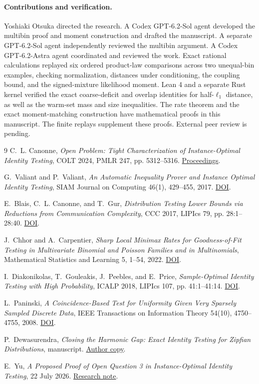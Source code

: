 \documentclass[11pt]{article}
\begin{document}
\paragraph{Contributions and verification.}
Yoshiaki Otsuka directed the research. A Codex GPT-6.2-Sol agent developed the multibin proof and moment construction and drafted the manuscript. A separate GPT-6.2-Sol agent independently reviewed the multibin argument. A Codex GPT-6.2-Astra agent coordinated and reviewed the work. Exact rational calculations replayed six ordered product-law comparisons across two unequal-bin examples, checking normalization, distances under conditioning, the coupling bound, and the signed-mixture likelihood moment. Lean 4 and a separate Rust kernel verified the exact coarse-deficit and overlap identities for half-$\ell_1$ distance, as well as the warm-set mass and size inequalities. The rate theorem and the exact moment-matching construction have mathematical proofs in this manuscript. The finite replays supplement these proofs. External peer review is pending.

\begin{thebibliography}{9}
\small
{}
C.~L. Canonne,
\emph{Open Problem: Tight Characterization of Instance-Optimal Identity Testing},
COLT 2024, PMLR 247, pp. 5312--5316.
\href{https://proceedings.mlr.press/v247/canonne24a.html}{Proceedings}.

G.~Valiant and P.~Valiant,
\emph{An Automatic Inequality Prover and Instance Optimal Identity Testing},
SIAM Journal on Computing 46(1), 429--455, 2017.
\href{https://doi.org/10.1137/151002526}{DOI}.

E.~Blais, C.~L. Canonne, and T.~Gur,
\emph{Distribution Testing Lower Bounds via Reductions from Communication Complexity},
CCC 2017, LIPIcs 79, pp. 28:1--28:40.
\href{https://doi.org/10.4230/LIPIcs.CCC.2017.28}{DOI}.

J.~Chhor and A.~Carpentier,
\emph{Sharp Local Minimax Rates for Goodness-of-Fit Testing in Multivariate Binomial and Poisson Families and in Multinomials},
Mathematical Statistics and Learning 5, 1--54, 2022.
\href{https://doi.org/10.4171/MSL/32}{DOI}.

I.~Diakonikolas, T.~Gouleakis, J.~Peebles, and E.~Price,
\emph{Sample-Optimal Identity Testing with High Probability},
ICALP 2018, LIPIcs 107, pp. 41:1--41:14.
\href{https://doi.org/10.4230/LIPIcs.ICALP.2018.41}{DOI}.

L.~Paninski,
\emph{A Coincidence-Based Test for Uniformity Given Very Sparsely Sampled Discrete Data},
IEEE Transactions on Information Theory 54(10), 4750--4755, 2008.
\href{https://doi.org/10.1109/TIT.2008.928987}{DOI}.

P.~Dewasurendra,
\emph{Closing the Harmonic Gap: Exact Identity Testing for Zipfian Distributions},
manuscript.
\href{https://andotheror.github.io/pdf/closing-the-harmonic-gap-exact-identity-testing-for-zipfian-distributi.pdf}{Author copy}.

E.~Yu,
\emph{A Proposed Proof of Open Question 3 in Instance-Optimal Identity Testing},
22 July 2026.
\href{https://quant.am/statistics/2026/07/22/closing-open-question-3/}{Research note}.
\end{thebibliography}
\end{document}
